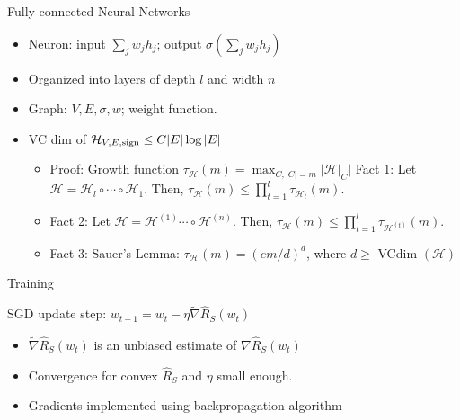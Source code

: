 \documentclass[final]{beamer}
\begin{document}
\begin{frame}{Fully connected Neural Networks}
	\begin{itemize}
		\item Neuron: input $\sum_j w_j h_j$; output $\sigma(\sum_j w_j h_j)$
		\item Organized into layers of depth $l$ and width $n$
		
		\item Graph: $V, E, \sigma, w$; weight function.
		\pause
	\item VC dim of $\mathcal{H}_{V, E, {\rm sign}} \leq C |E|\log |E|$
		\pause
		\begin{itemize}
		\item Proof: Growth function $\tau_{\mathcal{H}}(m) = \max_{C, |C|=m} |\mathcal{H}|_C| $
			\pause Fact 1: Let $\mathcal{H} =\mathcal{H}_l \circ \cdots \circ \mathcal{H}_1.$ Then,  $\tau_{\mathcal{H}}(m) \leq \prod_{t=1}^l \tau_{\mathcal{H}_t}(m)$.
			\pause 
			\item
			Fact 2: Let $\mathcal{H} =\mathcal{H}^{(1)}  \cdots \circ \mathcal{H}^{(n)}.$ Then,  $\tau_{\mathcal{H}}(m) \leq \prod_{t=1}^l \tau_{\mathcal{H}^{(t)}}(m)$.
			\pause 
		\item Fact 3: Sauer's Lemma: $\tau_{\mathcal{H}}(m) = (em/d)^d$, where $d \geq $ VCdim $(\mathcal{H})$ 
		\end{itemize}
	\end{itemize}

\end{frame}
\begin{frame}{Training}

\begin{tcolorbox}
	SGD update step: $w_{t+1} = w_t - \eta \tilde{\nabla}\hat{R}_S(w_t)$
\end{tcolorbox}
	\begin{itemize}
		\item $\tilde{\nabla}\hat{R}_S(w_t)$ is an unbiased estimate of $\nabla \hat{R}_S(w_t)$
		\item Convergence for convex $\hat{R}_S$ and $\eta$ small enough.
		\item Gradients implemented using backpropagation algorithm
	\end{itemize}
\end{frame}
\end{document}
